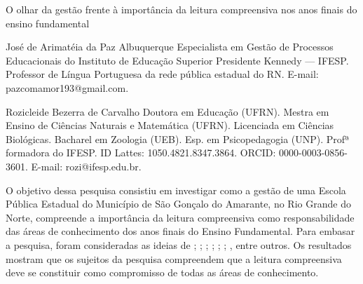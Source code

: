 \begin{refsection}
    \renewcommand{\thefigure}{\arabic{figure}}
    \renewcommand{\thetable}{\arabic{table}}
    \renewcommand{\thequadro}{\arabic{quadro}}
    
    \chapterOneLine
    {O olhar da gestão frente à importância da leitura compreensiva nos anos finais do ensino fundamental}
    \label{chap:olhargestao}
    
    \articleAuthor
    {José de Arimatéia da Paz Albuquerque}
    {Especialista em Gestão de Processos Educacionais do Instituto de Educação Superior Presidente Kennedy --- IFESP. Professor de Língua Portuguesa da rede pública estadual do RN. E-mail: pazcomamor193@gmail.com.}

    \articleAuthor
    {Rozicleide Bezerra de Carvalho}
    {Doutora em Educação (UFRN). Mestra em Ensino de Ciências Naturais e Matemática (UFRN). Licenciada em Ciências Biológicas. Bacharel em Zoologia (UEB). Esp. em Psicopedagogia (UNP). Profª formadora do IFESP. ID Lattes: 1050.4821.8347.3864. ORCID: 0000-0003-0856-3601. E-mail: rozi@ifesp.edu.br.}
    
    \begin{galoResumo}
        O objetivo dessa pesquisa consistiu em investigar como a gestão de uma Escola Pública Estadual do Município de São Gonçalo do Amarante, no Rio Grande do Norte, compreende a importância da leitura compreensiva como responsabilidade das áreas de conhecimento dos anos finais do Ensino Fundamental. Para embasar a pesquisa, foram consideradas as ideias de \textcite{Leffa1996Fatores}; \textcite{Geraldi1991Psicopedagogia}; \textcite{RojasEtAl2009Dificuldades}; \textcite{Lenner2002Ler}; \textcite{DiretrizesCur2013, BaNacCurEF2017}; \textcite{Sole1998Estrategias}; \textcite{BagnoEtAl2002Lingua}, entre outros. Os resultados mostram que os sujeitos da pesquisa compreendem que a leitura compreensiva deve se constituir como compromisso de todas as áreas de conhecimento.
    \end{galoResumo}
    
    

\end{refsection}
